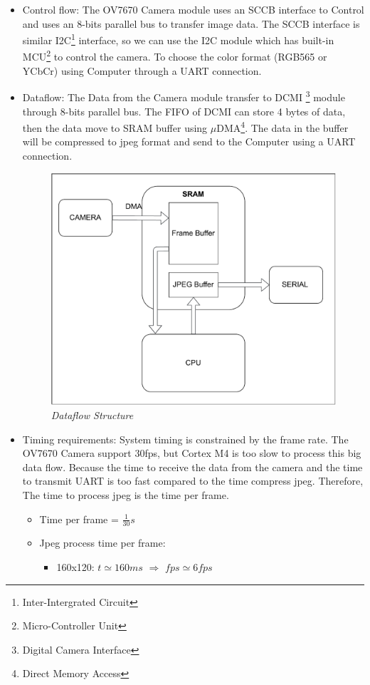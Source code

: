 \documentclass[D:/Latex/Internship/Report/Latex/Report.tex]{subfiles}
\begin{document}
		\begin{itemize}
			\item Control flow: The OV7670 Camera module uses an SCCB interface to Control and uses an 8-bits parallel bus to transfer image data. The SCCB interface is similar I2C{\footnote{Inter-Intergrated Circuit}} interface, so we can use the I2C module which has built-in MCU{\footnote{Micro-Controller Unit}} to control the camera. To choose the color format (RGB565 or YCbCr) using Computer through a UART connection.
			\item Dataflow: The Data from the Camera module transfer to DCMI {\footnote{Digital Camera Interface}} module through 8-bits parallel bus. The FIFO of DCMI can store 4 bytes of data, then the data move to SRAM buffer using ${\mu}$DMA{\footnote {Direct Memory Access}}. The data in the buffer will be compressed to jpeg format and send to the Computer using a UART connection.
			\begin{figure}[ht!]
				\centering
				\includegraphics[scale = 0.8]{Figure/DataFlow.pdf}
				\caption{\it Dataflow Structure}
				\label{fig:DataFlow}
			\end{figure}
			\newpage
			\item Timing requirements: System timing is constrained by the frame rate. The OV7670 Camera support 30fps, but Cortex M4 is too slow to process this big data flow. Because the time to receive the data from the camera and the time to transmit UART is too fast compared to the time compress jpeg. Therefore, The time to process jpeg is the time per frame.
			\begin{itemize}
				\item Time per frame = {\Large $ \frac{1}{30} s$}
				\item Jpeg process time per frame:
				\begin{itemize}
					\item 160x120: $t \simeq 160ms$ $\Rightarrow$ $fps \simeq 6fps$
				\end{itemize}
			\end{itemize}


\end{itemize}
\end{document}
